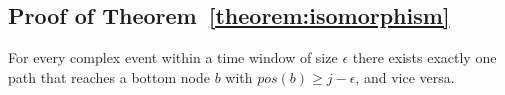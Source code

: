 \chapter{}\label{appendix:A}

\section{Proof of Theorem~\ref{theorem:isomorphism}}\label{appendix:A:sec:1}

\begin{theorem}
  For every complex event within a time window of size $\epsilon$ there exists exactly one path that reaches a bottom node $b$ with $pos(b) \ge j - \epsilon$, and vice versa.
\end{theorem}

